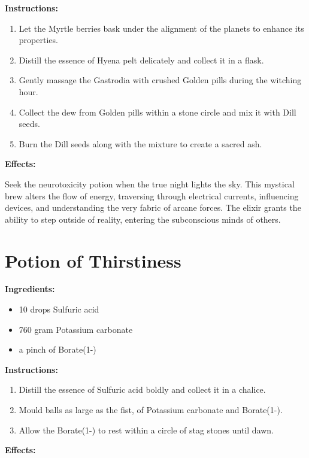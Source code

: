 \documentclass{article}
\begin{document}
\textbf{Instructions:}

\begin{enumerate}
  \item Let the Myrtle berries bask under the alignment of the planets to enhance its properties.
  \item Distill the essence of Hyena pelt delicately and collect it in a flask.
  \item Gently massage the Gastrodia with crushed Golden pills during the witching hour.
  \item Collect the dew from Golden pills within a stone circle and mix it with Dill seeds.
  \item Burn the Dill seeds along with the mixture to create a sacred ash.
\end{enumerate}

\textbf{Effects:}

Seek the neurotoxicity potion when the true night lights the sky. This mystical brew alters the flow of energy, traversing through electrical currents, influencing devices, and understanding the very fabric of arcane forces. The elixir grants the ability to step outside of reality, entering the subconscious minds of others.

\newpage
\section*{Potion of Thirstiness}

\textbf{Ingredients:}

\begin{itemize}
  \item 10 drops Sulfuric acid
  \item 760 gram Potassium carbonate
  \item a pinch of Borate(1-)
\end{itemize}

\textbf{Instructions:}

\begin{enumerate}
  \item Distill the essence of Sulfuric acid boldly and collect it in a chalice.
  \item Mould balls as large as the fist, of Potassium carbonate and Borate(1-).
  \item Allow the Borate(1-) to rest within a circle of stag stones until dawn.
\end{enumerate}

\textbf{Effects:}
\end{document}
